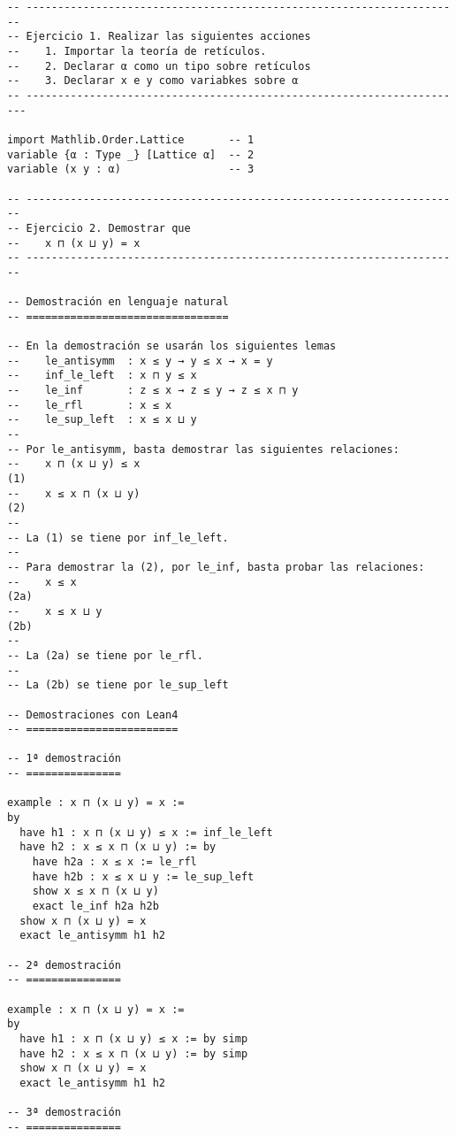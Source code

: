 \begin{verbatim}
-- ---------------------------------------------------------------------
-- Ejercicio 1. Realizar las siguientes acciones
--    1. Importar la teoría de retículos.
--    2. Declarar α como un tipo sobre retículos
--    3. Declarar x e y como variabkes sobre α
-- ----------------------------------------------------------------------

import Mathlib.Order.Lattice       -- 1
variable {α : Type _} [Lattice α]  -- 2
variable (x y : α)                 -- 3

-- ---------------------------------------------------------------------
-- Ejercicio 2. Demostrar que
--    x ⊓ (x ⊔ y) = x
-- ---------------------------------------------------------------------

-- Demostración en lenguaje natural
-- ================================

-- En la demostración se usarán los siguientes lemas
--    le_antisymm  : x ≤ y → y ≤ x → x = y
--    inf_le_left  : x ⊓ y ≤ x
--    le_inf       : z ≤ x → z ≤ y → z ≤ x ⊓ y
--    le_rfl       : x ≤ x
--    le_sup_left  : x ≤ x ⊔ y
--
-- Por le_antisymm, basta demostrar las siguientes relaciones:
--    x ⊓ (x ⊔ y) ≤ x                                                (1)
--    x ≤ x ⊓ (x ⊔ y)                                                (2)
--
-- La (1) se tiene por inf_le_left.
--
-- Para demostrar la (2), por le_inf, basta probar las relaciones:
--    x ≤ x                                                         (2a)
--    x ≤ x ⊔ y                                                     (2b)
--
-- La (2a) se tiene por le_rfl.
--
-- La (2b) se tiene por le_sup_left

-- Demostraciones con Lean4
-- ========================

-- 1ª demostración
-- ===============

example : x ⊓ (x ⊔ y) = x :=
by
  have h1 : x ⊓ (x ⊔ y) ≤ x := inf_le_left
  have h2 : x ≤ x ⊓ (x ⊔ y) := by
    have h2a : x ≤ x := le_rfl
    have h2b : x ≤ x ⊔ y := le_sup_left
    show x ≤ x ⊓ (x ⊔ y)
    exact le_inf h2a h2b
  show x ⊓ (x ⊔ y) = x
  exact le_antisymm h1 h2

-- 2ª demostración
-- ===============

example : x ⊓ (x ⊔ y) = x :=
by
  have h1 : x ⊓ (x ⊔ y) ≤ x := by simp
  have h2 : x ≤ x ⊓ (x ⊔ y) := by simp
  show x ⊓ (x ⊔ y) = x
  exact le_antisymm h1 h2

-- 3ª demostración
-- ===============


\end{verbatim}
